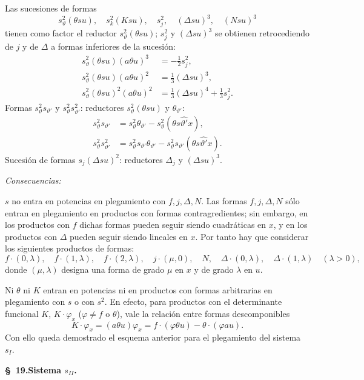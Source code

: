 \documentclass[11pt]{article}
\newcommand{\A}{\Delta}
\begin{document}
Las sucesiones de formas
\[
 s_\vartheta^2(\theta su),\quad s_k^2(Ksu),\quad s_j^2,\quad (\A su)^3,
 \quad (Nsu)^3
\]
tienen como factor el reductor $s_\vartheta^2(\theta su)$; $s_j^2$ y $(\A su)^3$ se obtienen retrocediendo de $j$ y de $\A$ a formas inferiores de la sucesión:
\[
\begin{aligned}
s_\vartheta^2(\theta su)(a\theta u)^3&=-\frac12s_j^2,\\
s_\vartheta^2(\theta su)(a\theta u)^2&=\frac13(\A su)^3,\\
s_\vartheta^2(\theta su)^2(a\theta u)^2&=\frac13(\A su)^4+\frac13s_j^2.
\end{aligned}
\]
Formas $s_\vartheta^2s_{\vartheta'}$ y $s_\vartheta^2s_{\vartheta'}^2$: reductores $s_\vartheta^2(\theta su)$ y $\theta_{\vartheta'}$:
\[
\begin{aligned}
s_\vartheta^2s_{\vartheta'}&=s_\vartheta^2\theta_{\vartheta'}-s_\vartheta^2(\theta s\widehat{\vartheta'}x),\\
s_\vartheta^2s_{\vartheta'}^2&=s_\vartheta^2s_{\vartheta'}\theta_{\vartheta'}-s_\vartheta^2s_{\vartheta'}(\theta s\widehat{\vartheta'}x).
\end{aligned}
\]
Sucesión de formas $s_j(\A su)^2$: reductores $\A_j$ y $(\A su)^3$.

\noindent\emph{Consecuencias:}

$s$ no entra en potencias en plegamiento con $f,j,\A,N$. Las formas $f,j,\A,N$ sólo entran en plegamiento en productos con formas contragredientes; sin embargo, en los productos con $f$ dichas formas pueden seguir siendo cuadráticas en $x$, y en los productos con $\A$ pueden seguir siendo lineales en $x$. Por tanto hay que considerar los siguientes productos de formas:
\[
 f\cdot(0,\lambda),\quad f\cdot(1,\lambda),\quad f\cdot(2,\lambda),\quad
 j\cdot(\mu,0),\quad N,\quad
 \A\cdot(0,\lambda),\quad \A\cdot(1,\lambda)\quad(\lambda>0),
\]
donde $(\mu,\lambda)$ designa una forma de grado $\mu$ en $x$ y de grado $\lambda$ en $u$.

Ni $\theta$ ni $K$ entran en potencias ni en productos con formas arbitrarias en plegamiento con $s$ o con $s^2$. En efecto, para productos con el determinante funcional $K$, $K\cdot\varphi_x$ ($\varphi\ne f$ o $\theta$), vale la relación entre formas descomponibles
\[
 K\cdot\varphi_x=(a\theta u)\varphi_x=f\cdot(\varphi\theta u)-\theta\cdot(\varphi au).
\]
Con ello queda demostrado el esquema anterior para el plegamiento del sistema $s_I$.

\begin{center}
\textbf{\S\ 19.\quad Sistema $s_{II}$.}
\end{center}
\end{document}
